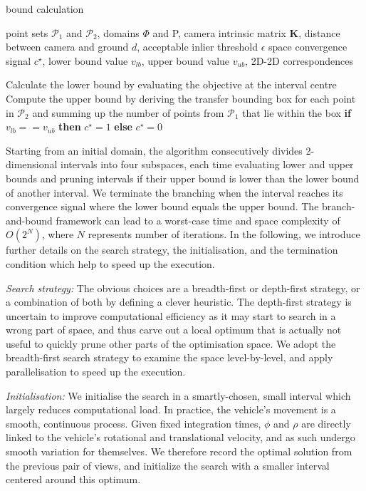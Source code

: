 \documentclass[letterpaper, 10 pt, conference]{ieeeconf}  %
\begin{document}
\begin{algorithm}
	\caption{bound calculation}
	\begin{algorithmic}[1]
		\Require point sets $\mathcal{P}_1$ and $\mathcal{P}_2$, domains $\Phi$ and P, camera intrinsic matrix $\textbf{K}$, distance between camera and ground $d$, acceptable inlier threshold $\epsilon$
		\Ensure space convergence signal $c^{\star}$, lower bound value $v_{lb}$, upper bound value $v_{ub}$, 2D-2D correspondences

		\State Calculate the lower bound by evaluating the objective at the interval centre
		\State Compute the upper bound by deriving the transfer bounding box for each point in $\mathcal{P}_2$ and summing up the number of points from $\mathcal{P}_1$ that lie within the box
		\State \textbf{if} $v_{lb} == v_{ub}$ \textbf{then} $c^{\star} = 1$ \textbf{else} $c^{\star} = 0$
	\end{algorithmic}
	\label{Space_Algorithm}
\end{algorithm}

Starting from an initial domain, the algorithm consecutively divides 2-dimensional intervals into four subspaces, each time evaluating lower and upper bounds and pruning intervals if their upper bound is lower than the lower bound of another interval. We terminate the branching when the interval reaches its convergence signal where the lower bound equals the upper bound. The branch-and-bound framework can lead to a worst-case time and space complexity of $O(2^N)$, where $N$ represents number of iterations. In the following, we introduce further details on the search strategy, the initialisation, and the termination condition which help to speed up the execution.

\textit{Search strategy:} The obvious choices are a breadth-first or depth-first strategy, or a combination of both by defining a clever heuristic. The depth-first strategy is uncertain to improve computational efficiency as it may start to search in a wrong part of space, and thus carve out a local optimum that is actually not useful to quickly prune other parts of the optimisation space. We adopt the breadth-first search strategy to examine the space level-by-level, and apply parallelisation to speed up the execution.

\textit{Initialisation:} We initialise the search in a smartly-chosen, small interval which largely reduces computational load. In practice, the vehicle's movement is a smooth, continuous process. Given fixed integration times, $\phi$ and $\rho$ are directly linked to the vehicle's rotational and translational velocity, and as such undergo smooth variation for themselves. We therefore record the optimal solution from the previous pair of views, and initialize the search with a smaller interval centered around this optimum.
\end{document}
